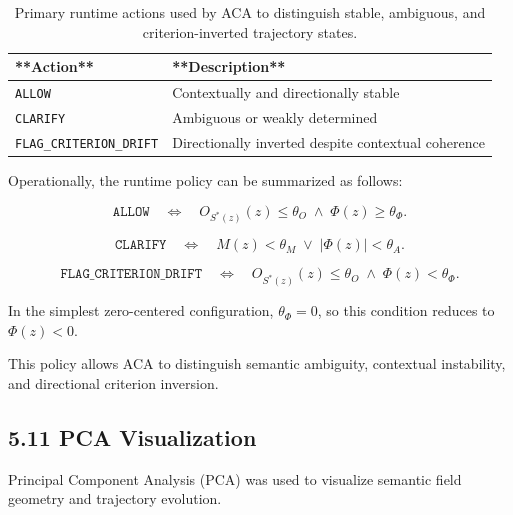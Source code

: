 \documentclass[11pt]{article}
\begin{document}
\begin{table}[h]

\centering

\begin{tabular}{ll}

\hline

**Action** & **Description** \\

\hline

\texttt{ALLOW} & Contextually and directionally stable \\

\texttt{CLARIFY} & Ambiguous or weakly determined \\

\texttt{FLAG\_CRITERION\_DRIFT} & Directionally inverted despite contextual coherence \\

\hline

\end{tabular}

\caption{Primary runtime actions used by ACA to distinguish stable, ambiguous, and criterion-inverted trajectory states.}

\label{tab:primary-runtime-actions}

\end{table}

Operationally, the runtime policy can be summarized as follows:

$$
\texttt{ALLOW}
\quad\Longleftrightarrow\quad
O_{S^{*}(z)}(z)\leq\theta_O
\;\wedge\;
\Phi(z)\geq\theta_\Phi.
$$

$$
\texttt{CLARIFY}
\quad\Longleftrightarrow\quad
M(z)<\theta_M
\;\vee\;
|\Phi(z)|<\theta_A.
$$

$$
\texttt{FLAG\_CRITERION\_DRIFT}
\quad\Longleftrightarrow\quad
O_{S^{*}(z)}(z)\leq\theta_O
\;\wedge\;
\Phi(z)<\theta_\Phi.
$$

In the simplest zero-centered configuration, $\theta_\Phi=0$, so this condition reduces to $\Phi(z)<0$.

This policy allows ACA to distinguish semantic ambiguity, contextual instability, and directional criterion inversion.

\subsection{5.11 PCA Visualization}

Principal Component Analysis (PCA) was used to visualize semantic field geometry and trajectory evolution.
\end{document}
